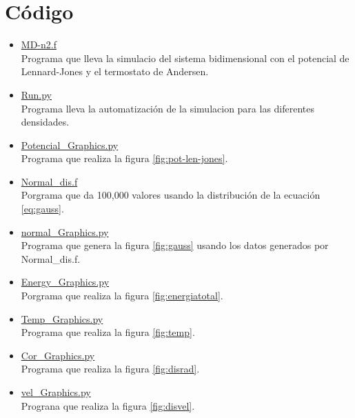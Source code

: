 \section{Código}
\begin{itemize}
    \item \href{https://github.com/giovannilopez9808/Notas_Agosto_2020/blob/master/Simulaciones/Proyecto_3/Scripts/MD-n2.f}{MD-n2.f}\\
    Programa que lleva la simulacio del sistema bidimensional con el potencial de Lennard-Jones y el termostato de Andersen.
    \item \href{https://github.com/giovannilopez9808/Notas_Agosto_2020/blob/master/Simulaciones/Proyecto_3/Scripts/Run.py}{Run.py}\\
    Programa lleva la automatización de la simulacion para las diferentes densidades.
    \item \href{https://github.com/giovannilopez9808/Notas_Agosto_2020/blob/master/Simulaciones/Proyecto_3/Scripts/Potencial_Graphics.py}{Potencial\_Graphics.py}\\
    Programa que realiza la figura \ref{fig:pot-len-jones}.
    \item \href{https://github.com/giovannilopez9808/Notas_Agosto_2020/blob/master/Simulaciones/Proyecto_3/Scripts/Normal_dis.f}{Normal\_dis.f}\\
    Porgrama que da 100,000 valores usando la distribución de la ecuación \ref{eq:gauss}.
    \item \href{https://github.com/giovannilopez9808/Notas_Agosto_2020/blob/master/Simulaciones/Proyecto_3/Scripts/normal_Graphics.py}{normal\_Graphics.py}\\
    Programa que genera la figura \ref{fig:gauss} usando los datos generados por Normal\_dis.f.
    \item \href{https://github.com/giovannilopez9808/Notas_Agosto_2020/blob/master/Simulaciones/Proyecto_3/Scripts/Energy_Graphics.py}{Energy\_Graphics.py}\\
    Porgrama que realiza la figura \ref{fig:energiatotal}.
    \item \href{https://github.com/giovannilopez9808/Notas_Agosto_2020/blob/master/Simulaciones/Proyecto_3/Scripts/Temp_Graphics.py}{Temp\_Graphics.py}\\
    Programa que realiza la figura \ref{fig:temp}.
    \item \href{https://github.com/giovannilopez9808/Notas_Agosto_2020/blob/master/Simulaciones/Proyecto_3/Scripts/Cor_Graphics.py}{Cor\_Graphics.py}\\
    Programa que realiza la figura \ref{fig:disrad}.
    \item \href{https://github.com/giovannilopez9808/Notas_Agosto_2020/blob/master/Simulaciones/Proyecto_3/Scripts/vel_Graphics.py}{vel\_Graphics.py}\\
    Prograna que realiza la figura \ref{fig:disvel}.
\end{itemize}
